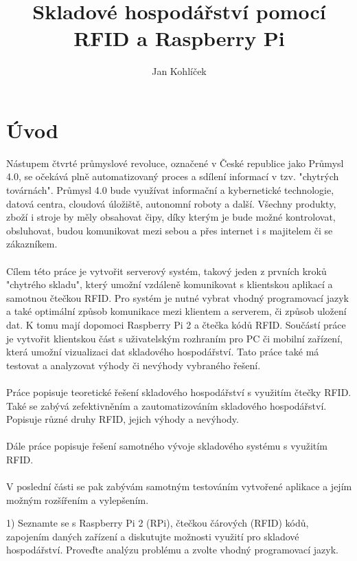 \documentclass[czech,BP]{thesiskiv}
\author{Jan Kohlíček}
\title{Skladové hospodářství pomocí RFID a Raspberry Pi}
\begin{document}
\maketitle
\tableofcontents


\chapter{Úvod}
\iffalse
Nástupem čtvrté průmyslové revoluce, označené v České republice jako Průmysl 4.0, se očekává plně automatizovaný proces a 
sdílení informací v tzv. "chytrých továrnách".
Průmysl 4.0 bude využívat informační a kybernetické technologie, datová centra, cloudová úložiště, autonomní roboty a
další. Všechny produkty, zboží i stroje by měly obsahovat čipy, díky kterým je bude možné kontrolovat, obsluhovat, budou 
komunikovat mezi sebou a přes internet i s majitelem či se zákazníkem. 
\\\\
 Cílem této práce je vytvořit serverový systém, takový jeden z prvních kroků "chytrého skladu", který umožní vzdáleně 
komunikovat s klientskou aplikací a samotnou čtečkou RFID. 
Pro systém je nutné vybrat vhodný programovací jazyk a také optimální způsob komunikace mezi klientem a serverem, 
či způsob uložení dat. K tomu mají dopomoci Raspberry Pi 2 a čtečka kódů RFID. 
Součástí práce je vytvořit klientskou část s uživatelským rozhraním pro PC či mobilní zařízení, která umožní 
vizualizaci dat skladového hospodářství. Tato práce také má testovat a analyzovat výhody či nevýhody vybraného řešení.
\\\\
Práce popisuje teoretické řešení skladového hospodářství s využitím čtečky RFID.  
Také se zabývá zefektivněním a zautomatizováním skladového hospodářství. Popisuje různé druhy RFID, jejich výhody a nevýhody.  
\\\\
Dále práce popisuje řešení samotného vývoje skladového systému s využitím RFID.
\\\\
V poslední části se pak zabývám samotným testováním vytvořené aplikace a jejím možným rozšířením a vylepšením. 












1) Seznamte se s Raspberry Pi 2 (RPi), čtečkou čárových (RFID) kódů, zapojením daných zařízení a diskutujte možnosti využití pro skladové hospodářství. Proveďte analýzu problému a zvolte vhodný programovací jazyk. 
\end{document}

